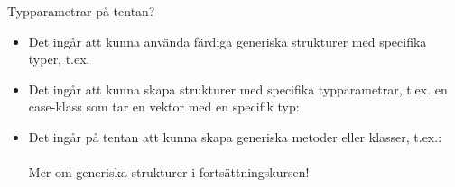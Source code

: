 \ifkompendium\else

\begin{Slide}{Typparametrar på tentan?}
\begin{itemize}
\item Det ingår att kunna använda färdiga generiska strukturer med specifika typer, t.ex. 

\item Det ingår att kunna skapa strukturer med specifika typparametrar, t.ex. en case-klass som tar en vektor med en specifik typ:\\



\item Det ingår  på tentan att kunna skapa generiska metoder eller klasser, t.ex.: \\
 \\
Mer om generiska strukturer i fortsättningskursen!
\end{itemize}
\end{Slide}

\fi






